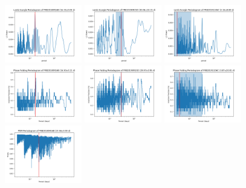 \documentclass[
  rmp,
  amsmath,
  amssymb,
  preprint]{revtex4-2}
\begin{document}
\begin{figure}
\begin{minipage}[t]{\linewidth}
{\includegraphics[width=0.3\textwidth,height=\textheight]{./img/FRB20180916B-periodogram-LS.png}
\includegraphics[width=0.3\textwidth,height=\textheight]{./img/FRB20190915D-periodogram-LS.png}
\includegraphics[width=0.3\textwidth,height=\textheight]{./img/FRB20191106C-periodogram-LS.png}
\includegraphics[width=0.3\textwidth,height=\textheight]{./img/FRB20180916B-periodogram-PF.png}
\includegraphics[width=0.3\textwidth,height=\textheight]{./img/FRB20190915D-periodogram-PF.png}
\includegraphics[width=0.3\textwidth,height=\textheight]{./img/FRB20191106C-periodogram-PF.png}
\includegraphics[width=0.3\textwidth,height=\textheight]{./img/FRB20180916B-periodogram-PDM.png}
}
\end{minipage}
\end{figure}
\end{document}
